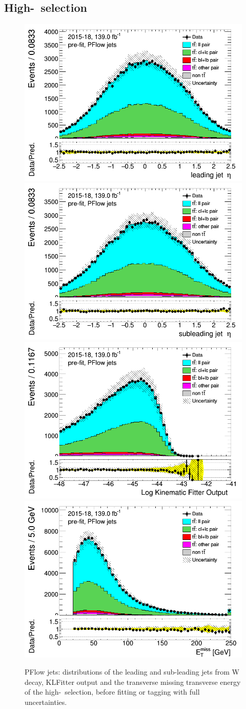 \documentclass[letterpaper,12pt]{article}
\begin{document}
\subsection{High-\pt\ selection}
\label{sec:appendix_highpT_selection}
\newpage	
\begin{figure}[H]
\includegraphics[width=.45\textwidth]{FTAG_plots/pretagNoRwnewonlyPFlowall/DataMC_h_J0_eta.png}
\includegraphics[width=.45\textwidth]{FTAG_plots/pretagNoRwnewonlyPFlowall/DataMC_h_J1_eta.png}\\
\includegraphics[width=.45\textwidth]{FTAG_plots/pretagNoRwnewonlyPFlowall/DataMC_h_LLR.png}
\includegraphics[width=.45\textwidth]{FTAG_plots/pretagNoRwnewonlyPFlowall/DataMC_h_MET.png}\\

\caption{PFlow jets: distributions of the leading and sub-leading jets 
from W decay, KLFitter output and the transverse missing transverse 
energy of the high-\pt\ selection, before fitting or tagging with 
full uncertainties.} \label{fig:highpT_jets_VRJets}
\end{figure}
\end{document}
